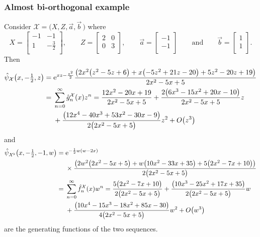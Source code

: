 \documentclass[10pt,a4paper]{amsart}
\numberwithin{equation}{section}
\theoremstyle{definition}
\def\X{\mathcal{X}}
\def\ff{\hat f}
\def\gg{\hat g}
\begin{document}
\subsubsection{Almost bi-orthogonal example}
Consider
$
\X=\bigl(X,Z,\vec a,\vec b\,\bigr)$ where
\[
X=\left[
\begin{matrix}
 -1 & -1 \\
 1 & -\frac{3}{2} \\
\end{matrix}
\right]
,\qquad Z=\left[
\begin{matrix}
 2 & 0 \\
 0 & 3 \\
\end{matrix}
\right]
,\qquad \vec a=\left[
\begin{matrix}
 -1 \\
 -1 \\
\end{matrix}
\right]\qquad\text{and}\qquad
\vec b=\left[
\begin{matrix}
 1 \\
 1 \\
\end{matrix}
\right].
\]
Then
\begin{align*}
\hat\psi_{\X}\bigl(x,-\tfrac{1}{2},z\bigr)={}&{\rm e}^{x z-\frac{z^2}{2}}\frac{
 \bigl(2 x^2 \bigl(z^2-5
 z+6\bigr)+x \bigl(-5 z^2+21
 z-20\bigr)+5 z^2-20
 z+19\bigr)}{2 x^2-5 x+5}\\
 ={}&\sum_{n=0}^{\infty} \gg_n^{\X}(x)z^n
 =\frac{12 x^2-20 x+19}{2 x^2-5
 x+5}+\frac{2 \bigl(6 x^3-15
 x^2+20 x-10\bigr) }{2 x^2-5
 x+5}z\\
 &+\frac{\bigl(12 x^4-40
 x^3+53 x^2-30 x-9\bigr)
 }{2 \bigl(2 x^2-5
 x+5\bigr)}z^2+O\bigl(z^3\bigr)
\end{align*}
 and
\begin{align*}
 \hat \psi_{\X^\flat}\bigl(x,-\tfrac{1}{2},-1,w\bigr)
={}&
{\rm e}^{-\frac{1}{2} w (w-2 x)}\\
&\times\frac{
 \bigl(2 w^2 \bigl(2 x^2-5
 x+5\bigr)+w \bigl(10 x^2-33
 x+35\bigr)+5 \bigl(2 x^2-7
 x+10\bigr)\bigr)}{2 \bigl(2
 x^2-5 x+5\bigr)}\\
 ={}&\sum_{n=0}^{\infty} \ff_n^{\X}(x)w^n
 =\frac{5 \bigl(2 x^2-7
 x+10\bigr)}{2 \bigl(2 x^2-5
 x+5\bigr)}+\frac{ \bigl(10
 x^3-25 x^2+17 x+35\bigr)}{2
 \bigl(2 x^2-5
 x+5\bigr)}w \\
 &
 +\frac{ \bigl(10
 x^4-15 x^3-18 x^2+85
 x-30\bigr)}{4 \bigl(2 x^2-5
 x+5\bigr)}w^2+O\bigl(w^3\bigr)
\end{align*}
are the generating functions of the two sequences.
\end{document}
